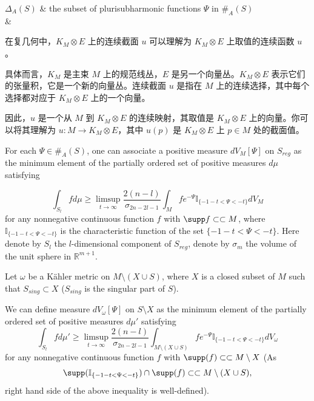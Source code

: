 \begin{center}
\begin{tblr}
$\Delta_{A}(S)$ & the subset of plurisubharmonic functions
$\Psi$ in $\#_{A}(S)$\\
 & \\ 
\end{tblr}
\end{center}

\begin{remark}
在复几何中，$K_M \otimes E$ 上的连续截面 $u$ 可以理解为 $K_M \otimes E$ 上取值的连续函数 $u$。

具体而言，$K_M$ 是主束 $M$ 上的规范线丛，$E$ 是另一个向量丛。$K_M \otimes E$ 表示它们的张量积，它是一个新的向量丛。连续截面 $u$ 是指在 $M$ 上的连续选择，其中每个选择都对应于 $K_M \otimes E$ 上的一个向量。

因此，$u$ 是一个从 $M$ 到 $K_M \otimes E$ 的连续映射，其取值是 $K_M \otimes E$ 上的向量。你可以将其理解为 $u: M \rightarrow K_M \otimes E$，其中 $u(p)$ 是 $K_M \otimes E$ 上 $p\in M$ 处的截面值。
\end{remark}

For each $\Psi\in\#_{A}(S)$, one can associate a positive measure
$dV_{M}[\Psi]$ on $S_{reg}$ as the minimum element of the partially
ordered set of positive measures $d\mu$ satisfying

$$\int_{S_{l}}fd\mu\geq\limsup_{t\to\infty}\frac{2(n-l)}
{\sigma_{2n-2l-1}}\int_{M}fe^{-\Psi}\mathbb{I}_{\{-1-t<\Psi<-t\}}dV_{M}$$
for any nonnegative continuous function $f$ with $\supp
f\subset\subset M$, where $\mathbb{I}_{\{-1-t<\Psi<-t\}}$ is the
characteristic function of the set $\{-1-t<\Psi<-t\}$. Here denote
by $S_{l}$ the $l$-dimensional component of $S_{reg}$, denote by
$\sigma_{m}$ the volume of the unit sphere in $\mathbb{R}^{m+1}$.

Let $\omega$ be a K\"{a}hler metric on $M\setminus (X\cup S)$, where
$X$ is a closed subset of $M$ such that $S_{sing}\subset X$
($S_{sing}$ is the singular part of $S$).

We can define measure $dV_{\omega}[\Psi]$ on $S\setminus X$ as the
minimum element of the partially ordered set of positive measures
$d\mu'$ satisfying
$$\int_{S_{l}}fd\mu'\geq\limsup_{t\to\infty}\frac{2(n-l)}
{\sigma_{2n-2l-1}}\int_{M\setminus (X\cup S)}fe^{-\Psi}\mathbb{I}_{\{-1-t<\Psi<-t\}}dV_{\omega}$$
for any nonnegative continuous function $f$ with
$\supp (f)\subset\subset M\setminus X$
(As $$\supp(\mathbb{I}_{\{-1-t<\Psi<-t\}})\cap \supp(f)\subset\subset M\setminus (X\cup S),$$
right hand side of the above inequality is well-defined).

